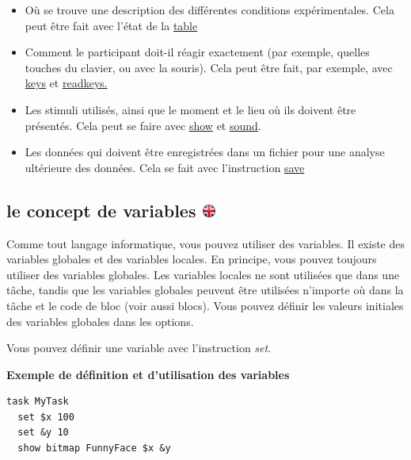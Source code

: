 \documentclass[
]{book}
\providecommand{\tightlist}{%
  \setlength{\itemsep}{0pt}\setlength{\parskip}{0pt}}
\begin{document}
\begin{itemize}
\tightlist
\item
  Où se trouve une description des différentes conditions expérimentales. Cela peut être fait avec l'état de la \protect\hyperlink{task-table}{table}
\item
  Comment le participant doit-il réagir exactement (par exemple, quelles touches du clavier, ou avec la souris). Cela peut être fait, par exemple, avec \protect\hyperlink{task-keys}{keys} et \protect\hyperlink{task-readkey}{readkeys.}
\item
  Les stimuli utilisés, ainsi que le moment et le lieu où ils doivent être présentés. Cela peut se faire avec \protect\hyperlink{task-show}{show} et \protect\hyperlink{task-sound}{sound}.
\item
  Les données qui doivent être enregistrées dans un fichier pour une analyse ultérieure des données. Cela se fait avec l'instruction \protect\hyperlink{task-save}{save}
\end{itemize}

\hypertarget{le-concept-de-variables}{%
\subsection[le concept de variables ]{\texorpdfstring{le concept de variables \href{https://www.psytoolkit.org/doc3.4.0/syntax.html\#variables-explained}{\protect\includegraphics{img/ukflag.png}}}{le concept de variables }}\label{le-concept-de-variables}}

Comme tout langage informatique, vous pouvez utiliser des variables. Il existe des variables globales et des variables locales. En principe, vous pouvez toujours utiliser des variables globales. Les variables locales ne sont utilisées que dans une tâche, tandis que les variables globales peuvent être utilisées n'importe où dans la tâche et le code de bloc (voir aussi blocs). Vous pouvez définir les valeurs initiales des variables globales dans les options.

Vous pouvez définir une variable avec l'instruction \emph{set}.

\textbf{Exemple de définition et d'utilisation des variables}

\begin{verbatim}
task MyTask
  set $x 100
  set &y 10
  show bitmap FunnyFace $x &y
\end{verbatim}
\end{document}
